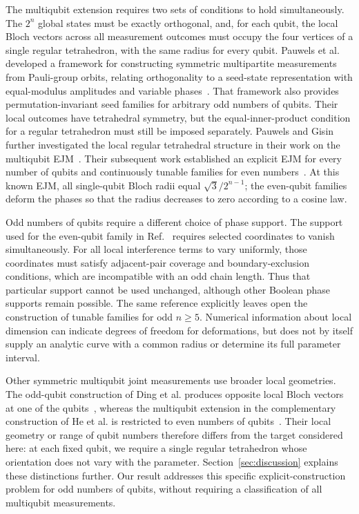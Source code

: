 \documentclass[11pt,a4paper]{article}
\numberwithin{equation}{section}
\theoremstyle{definition}
\begin{document}
The multiqubit extension requires two sets of conditions to hold simultaneously. The $2^n$ global states must be exactly orthogonal, and, for each qubit, the local Bloch vectors across all measurement outcomes must occupy the four vertices of a single regular tetrahedron, with the same radius for every qubit. Pauwels et al. developed a framework for constructing symmetric multipartite measurements from Pauli-group orbits, relating orthogonality to a seed-state representation with equal-modulus amplitudes and variable phases~\cite{PauwelsPauli2026}. That framework also provides permutation-invariant seed families for arbitrary odd numbers of qubits. Their local outcomes have tetrahedral symmetry, but the equal-inner-product condition for a regular tetrahedron must still be imposed separately. Pauwels and Gisin further investigated the local regular tetrahedral structure in their work on the multiqubit EJM~\cite{PauwelsEJM2026}. Their subsequent work established an explicit EJM for every number of qubits and continuously tunable families for even numbers~\cite{PauwelsTunable2026}. At this known EJM, all single-qubit Bloch radii equal $\sqrt3/2^{n-1}$; the even-qubit families deform the phases so that the radius decreases to zero according to a cosine law.

Odd numbers of qubits require a different choice of phase support. The support used for the even-qubit family in Ref.\ \cite{PauwelsTunable2026} requires selected coordinates to vanish simultaneously. For all local interference terms to vary uniformly, those coordinates must satisfy adjacent-pair coverage and boundary-exclusion conditions, which are incompatible with an odd chain length. Thus that particular support cannot be used unchanged, although other Boolean phase supports remain possible. The same reference explicitly leaves open the construction of tunable families for odd $n\geq5$. Numerical information about local dimension can indicate degrees of freedom for deformations, but does not by itself supply an analytic curve with a common radius or determine its full parameter interval.

Other symmetric multiqubit joint measurements use broader local geometries. The odd-qubit construction of Ding et al. produces opposite local Bloch vectors at one of the qubits~\cite{Ding2025}, whereas the multiqubit extension in the complementary construction of He et al. is restricted to even numbers of qubits~\cite{He2026}. Their local geometry or range of qubit numbers therefore differs from the target considered here: at each fixed qubit, we require a single regular tetrahedron whose orientation does not vary with the parameter. Section~\ref{sec:discussion} explains these distinctions further. Our result addresses this specific explicit-construction problem for odd numbers of qubits, without requiring a classification of all multiqubit measurements.
\end{document}
